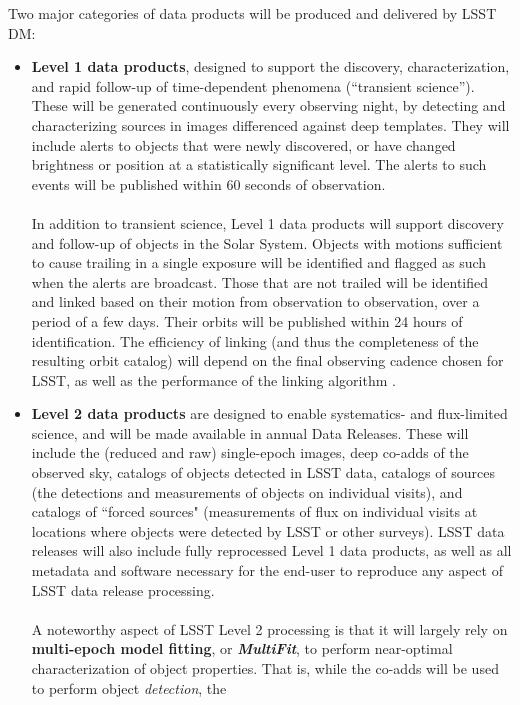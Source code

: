 \documentclass[11pt,twoside]{article}
\begin{document}
Two major categories of data products will be produced and delivered by LSST DM:
\begin{itemize}
\item {\bf Level 1 data products}, designed to support the discovery,
  characterization, and rapid follow-up of time-dependent phenomena
  (``transient science''). These will be generated continuously every
  observing night, by detecting and characterizing sources in images
  differenced against deep templates. They will include alerts to
  objects that were newly discovered, or have changed brightness or
  position at a statistically significant level. The alerts to such
  events will be published within 60   seconds of observation.\\
\\
In addition to transient science, Level 1 data products will support
discovery and follow-up of objects in the Solar System. Objects with
motions sufficient to cause trailing in a single exposure will be
identified and flagged as such when the alerts are broadcast. Those
that are not trailed will be identified and linked based on their
motion from observation to observation, over a period of a few
days. Their orbits will be published within 24 hours of
identification. The efficiency of linking (and thus the completeness
of the resulting orbit catalog) will depend on the final observing
cadence chosen for LSST, as well as the performance of the linking
algorithm \citep{LDM-156}.
\item {\bf Level 2 data products} are designed to enable systematics- and flux-limited science, and will be made available in annual Data Releases. These will include the (reduced and raw) single-epoch images, deep co-adds of the observed sky, catalogs of objects detected in LSST data, catalogs of sources (the detections and measurements of objects on individual visits), and catalogs of ``forced sources" (measurements of flux on individual visits at locations where objects were detected by LSST or other surveys). LSST data releases will also include fully reprocessed Level 1 data products, as well as all metadata and software necessary for the end-user to reproduce any aspect of LSST data release processing.\\
\\
A noteworthy aspect of LSST Level 2 processing is that it will largely
rely on {\bf multi-epoch model fitting}, or {\bf \em MultiFit}, to
perform near-optimal characterization of object properties. That is,
while the co-adds will be used to perform object {\em detection}, the

\end{itemize}
\end{document}
